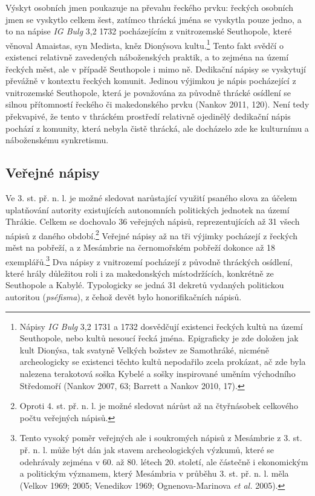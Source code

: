 Výskyt osobních jmen poukazuje na převahu řeckého prvku: řeckých osobních jmen se vyskytlo celkem šest, zatímco thrácká jména se vyskytla pouze jedno, a to na nápise {\em IG Bulg} 3,2 1732 pocházejícím z vnitrozemské Seuthopole, které věnoval Amaistas, syn Medista, kněz Dionýsova kultu.\footnote{Nápisy {\em IG Bulg} 3,2 1731 a 1732 dosvědčují existenci řeckých kultů na území Seuthopole, nebo kultů nesoucí řecká jména. Epigraficky je zde doložen jak kult Dionýsa, tak svatyně Velkých božstev ze Samothráké, nicméně archeologicky se existenci těchto kultů nepodařilo zcela prokázat, ač zde byla nalezena terakotová soška Kybelé a sošky inspirované uměním východního Středomoří (Nankov 2007, 63; Barrett a Nankov 2010, 17).} Tento fakt svědčí o existenci relativně zavedených náboženských praktik, a to zejména na území řeckých měst, ale v případě Seuthopole i mimo ně. Dedikační nápisy se vyskytují převážně v kontextu řeckých komunit. Jedinou výjimkou je nápis pocházející z vnitrozemské Seuthopole, která je považována za původně thrácké osídlení se silnou přítomností řeckého či makedonského prvku (Nankov 2011, 120). Není tedy překvapivé, že tento v thráckém prostředí relativně ojedinělý dedikační nápis pochází z komunity, která nebyla čistě thrácká, ale docházelo zde ke kulturnímu a náboženskému synkretismu.

\subsection[veřejné-nápisy-5]{Veřejné nápisy}

Ve 3. st. př. n. l. je možné sledovat narůstající využití psaného slova za účelem uplatňování autority existujících autonomních politických jednotek na území Thrákie. Celkem se dochovalo 36 veřejných nápisů, reprezentujících až 31  všech nápisů z daného období.\footnote{Oproti 4. st. př. n. l. je možné sledovat nárůst až na čtyřnásobek celkového počtu veřejných nápisů.} Veřejné nápisy až na tři výjimky pocházejí z řeckých měst na pobřeží, a z Mesámbrie na černomořském pobřeží dokonce až 18 exemplářů.\footnote{Tento vysoký poměr veřejných ale i soukromých nápisů z Mesámbrie z 3. st. př. n. l. může být dán jak stavem archeologických výzkumů, které se odehrávaly zejména v 60. až 80. létech 20. století, ale částečně i ekonomickým a politickým významem, který Mesámbria v průběhu 3. st. př. n. l. měla (Velkov 1969; 2005; Venedikov 1969; Ognenova-Marinova {\em et al.} 2005).} Dva nápisy z vnitrozemí pocházejí z původně thráckých osídlení, které hrály důležitou roli i za makedonských místodržících, konkrétně ze Seuthopole a Kabylé. Typologicky se jedná 31 dekretů vydaných politickou autoritou ({\em pséfisma}), z čehož devět bylo honorifikačních nápisů.

